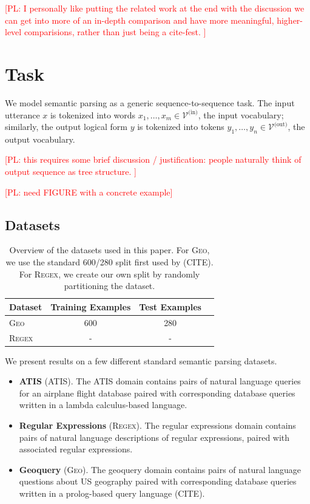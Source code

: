 \documentclass[11pt,letterpaper]{article}
\newcommand{\atis}{\textsc{ATIS}\xspace}
\newcommand{\regex}{\textsc{Regex}\xspace}
\newcommand{\geo}{\textsc{Geo}\xspace}
\newcommand{\vocabin}{\mathcal{V}^{\text{(in)}}}
\newcommand{\vocabout}{\mathcal{V}^{\text{(out)}}}
\newcommand\pl[1]{\textcolor{red}{[PL: #1]}}
\begin{document}
\pl{I personally like putting the related work at the end with the discussion
we can get into more of an in-depth comparison and have more meaningful,
higher-level comparisions, rather than just being a cite-fest.
}

\section{Task}
We model semantic parsing as a generic sequence-to-sequence task.
The input utterance $x$ is tokenized into words $x_1, \dotsc, x_m
\in \vocabin$, the input vocabulary;
similarly, the output logical form $y$ is tokenized
into tokens $y_1, \dotsc, y_n \in \vocabout$, the output vocabulary.

\pl{this requires some brief discussion / justification: people
naturally think of output sequence as tree structure.
}

\pl{need FIGURE with a concrete example}

\subsection{Datasets}
\begin{table}[t]
  \centering
  \small
  \begin{tabular}{|l|c|c|c|}
    \hline
    Dataset & Training Examples & Test Examples \\
    \hline
    \geo & 600 & 280 \\
    \regex & - & - \\
    \hline
  \end{tabular}
  \caption{Overview of the datasets used in this paper.  
  For \geo, we use the standard 600/280 split first used by (CITE).
  For \regex, we create our own split by randomly partitioning
the dataset.}
  \label{tab:datasets}
\end{table}

We present results on a few different standard semantic parsing datasets.

\begin{itemize}
  \item \textbf{ATIS} (\atis).  The ATIS domain contains pairs of
    natural language queries for an airplane flight database
    paired with corresponding database queries written in a 
    lambda calculus-based language.

  \item \textbf{Regular Expressions} (\regex).  The regular expressions domain
contains pairs of natural language descriptions of regular expressions,
paired with associated regular expressions.

  \item \textbf{Geoquery} (\geo).  The geoquery domain
contains pairs of natural language questions about US geography
paired with corresponding database queries written in a prolog-based
query language (CITE).
\end{itemize}
\end{document}
